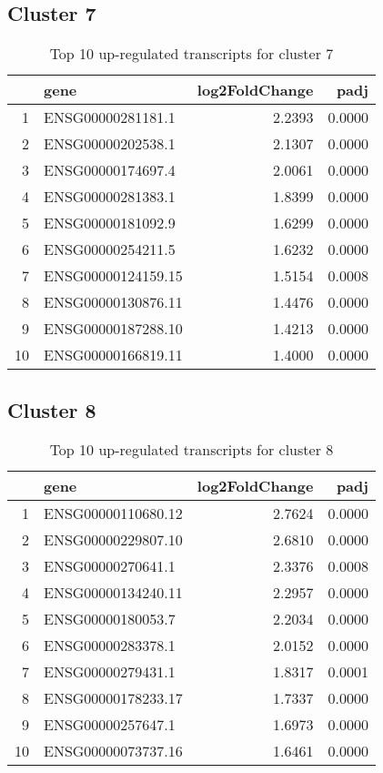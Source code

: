 \documentclass{article}
\begin{document}
\subsection{Cluster 7 }
\begin{table}[H]
\centering
\begin{tabularx}{\textwidth}{rlrr}
  \hline
 & gene & log2FoldChange & padj \\ 
  \hline
1 & ENSG00000281181.1 & 2.2393 & 0.0000 \\ 
  2 & ENSG00000202538.1 & 2.1307 & 0.0000 \\ 
  3 & ENSG00000174697.4 & 2.0061 & 0.0000 \\ 
  4 & ENSG00000281383.1 & 1.8399 & 0.0000 \\ 
  5 & ENSG00000181092.9 & 1.6299 & 0.0000 \\ 
  6 & ENSG00000254211.5 & 1.6232 & 0.0000 \\ 
  7 & ENSG00000124159.15 & 1.5154 & 0.0008 \\ 
  8 & ENSG00000130876.11 & 1.4476 & 0.0000 \\ 
  9 & ENSG00000187288.10 & 1.4213 & 0.0000 \\ 
  10 & ENSG00000166819.11 & 1.4000 & 0.0000 \\ 
   \hline
\end{tabularx}
\caption{Top 10 up-regulated transcripts for cluster 7} 
\label{tab:q3_1_7}
\end{table}
\subsection{Cluster 8 }
\begin{table}[H]
\centering
\begin{tabularx}{\textwidth}{rlrr}
  \hline
 & gene & log2FoldChange & padj \\ 
  \hline
1 & ENSG00000110680.12 & 2.7624 & 0.0000 \\ 
  2 & ENSG00000229807.10 & 2.6810 & 0.0000 \\ 
  3 & ENSG00000270641.1 & 2.3376 & 0.0008 \\ 
  4 & ENSG00000134240.11 & 2.2957 & 0.0000 \\ 
  5 & ENSG00000180053.7 & 2.2034 & 0.0000 \\ 
  6 & ENSG00000283378.1 & 2.0152 & 0.0000 \\ 
  7 & ENSG00000279431.1 & 1.8317 & 0.0001 \\ 
  8 & ENSG00000178233.17 & 1.7337 & 0.0000 \\ 
  9 & ENSG00000257647.1 & 1.6973 & 0.0000 \\ 
  10 & ENSG00000073737.16 & 1.6461 & 0.0000 \\ 
   \hline
\end{tabularx}
\caption{Top 10 up-regulated transcripts for cluster 8} 
\label{tab:q3_1_8}
\end{table}
\end{document}
